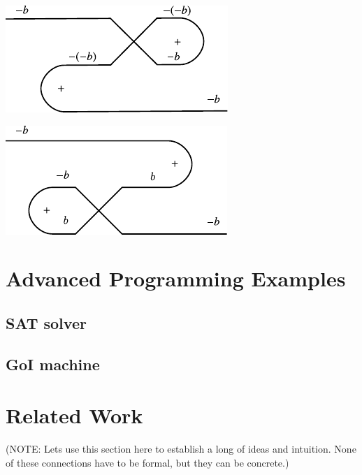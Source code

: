 \documentclass[preprint]{sigplanconf}
\begin{document}
\begin{itemize}
\begin{center}
  \includegraphics{diagrams/neg_circuit1.pdf}
\end{center}

\begin{center}
  \includegraphics{diagrams/neg_circuit2.pdf}
\end{center}

\end{itemize}

\section{Advanced Programming Examples}

\subsection{SAT solver}

\subsection{GoI machine}

\section{Related Work} 
\label{sec:related}

(NOTE: Lets use this section here to establish a long of ideas and
intuition. None of these connections have to be formal, but they can
be concrete.)
\end{document}
